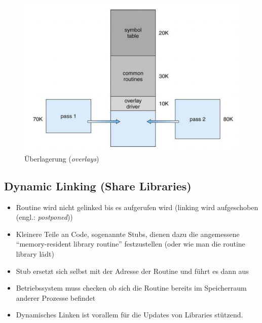 \documentclass[a4paper]{scrreprt}
\begin{document}
\begin{figure}[ht]
\centering
\includegraphics[scale=0.50]{overlays.png}
\caption{Überlagerung (\textit{overlays})}
\end{figure}

\subsection{Dynamic Linking (Share Libraries)}
\begin{itemize}
\item Routine wird nicht gelinked bis es aufgerufen wird (linking wird aufgeschoben (engl.: \textit{postponed}))
\item Kleinere Teile an Code, sogenannte Stubs, dienen dazu die angemessene "`memory-resident library routine"' festzustellen (oder wie man die routine library lädt)
\item Stub ersetzt sich selbst mit der Adresse der Routine und führt es dann aus
\item Betriebssystem muss checken ob sich die Routine  bereits im Speicherraum anderer Prozesse befindet
\item Dynamisches Linken ist vorallem für die Updates von Libraries stützend.
\end{itemize}
\end{document}
